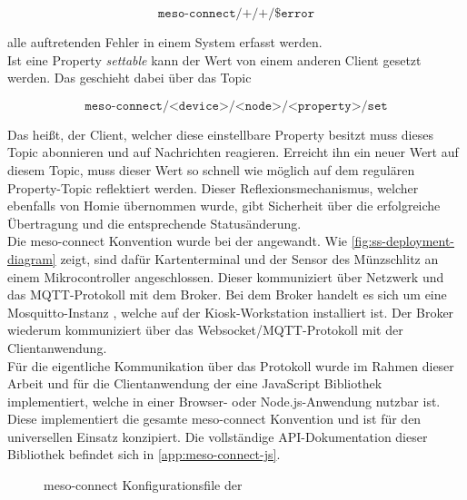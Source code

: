 \[\texttt{meso-connect/+/+/\$error} \]

alle auftretenden Fehler in einem System erfasst werden.\\

Ist eine Property \emph{settable} kann der Wert von einem anderen Client gesetzt werden. Das geschieht dabei 
über das Topic

\[\texttt{meso-connect/<device>/<node>/<property>/set} \]

Das heißt, der Client, welcher diese einstellbare Property besitzt muss dieses Topic abonnieren und
auf Nachrichten reagieren. Erreicht ihn ein neuer Wert auf diesem Topic, muss dieser Wert so schnell wie 
möglich auf dem regulären Property-Topic reflektiert werden. Dieser Reflexionsmechanismus, welcher ebenfalls von Homie
übernommen wurde, gibt Sicherheit über die erfolgreiche Übertragung und die entsprechende Statusänderung.\\

Die meso-connect Konvention wurde bei der \shst{} angewandt. Wie \autoref{fig:ss-deployment-diagram} zeigt,
sind dafür Kartenterminal und der Sensor des Münzschlitz an einem Mikrocontroller angeschlossen. Dieser
kommuniziert über Netzwerk und das MQTT-Protokoll mit dem Broker. Bei dem Broker handelt es sich um 
eine Mosquitto-Instanz \cite{mosquitto}, welche auf der Kiosk-Workstation installiert ist. 
Der Broker wiederum kommuniziert über das Websocket/MQTT-Protokoll
mit der Clientanwendung.\\
Für die eigentliche Kommunikation über das Protokoll wurde im Rahmen dieser Arbeit und für die Clientanwendung 
der \shst{} eine JavaScript Bibliothek implementiert, welche in einer Browser- oder Node.js-Anwendung
nutzbar ist. Diese implementiert die gesamte meso-connect Konvention und ist für den universellen Einsatz
konzipiert. Die vollständige API-Dokumentation dieser Bibliothek befindet sich in \autoref{app:meso-connect-js}.

\begin{figure}
  
  \caption{meso-connect Konfigurationsfile der \shst{}}
  \label{fig:shst-meso-connect-config}
\end{figure}

